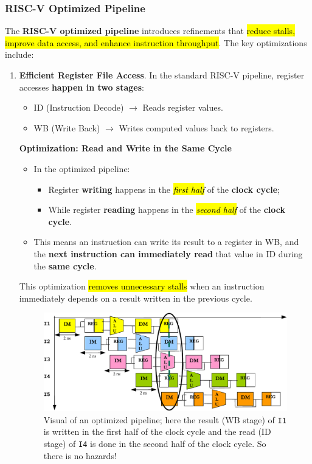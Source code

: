 \subsubsection{RISC-V Optimized Pipeline}

The \textbf{RISC-V optimized pipeline} introduces refinements that \hl{reduce stalls, improve data access, and enhance instruction throughput}. The key optimizations include:  
\begin{enumerate}[label=\textcolor{Green3}{\faIcon{check}}]
   \item \textcolor{Green3}{\textbf{Efficient Register File Access}}. In the standard RISC-V pipeline, register accesses \textbf{happen in two stages}:
   \begin{itemize}
      \item ID (Instruction Decode) $\rightarrow$ Reads register values.
      \item WB (Write Back) $\rightarrow$ Writes computed values back to registers.
   \end{itemize}

   \textcolor{Green3}{\faIcon{\speedIcon} \textbf{Optimization: Read and Write in the Same Cycle}}
   \begin{itemize}
      \item In the optimized pipeline:
      \begin{itemize}
         \item Register \textbf{writing} happens in the \hl{\emph{first half}} of the \textbf{clock cycle};
         \item While register \textbf{reading} happens in the \hl{\emph{second half}} of the \textbf{clock cycle}.
      \end{itemize}
      \item This means an instruction can write its result to a register in WB, and the \textbf{next instruction can immediately read} that value in ID during the \textbf{same cycle}.
   \end{itemize}
   This optimization \hl{removes unnecessary stalls} when an instruction immediately depends on a result written in the previous cycle.

   \begin{figure}[!htp]
      \centering
      \includegraphics[width=\textwidth]{img/risc-v-optimized-pipeline-1.pdf}
      \caption{Visual  of an optimized pipeline; here the result (WB stage) of \texttt{I1} is written in the first half of the clock cycle and the read (ID stage) of \texttt{I4} is done in the second half of the clock cycle. So there is no hazards!}
   \end{figure}



\end{enumerate}
